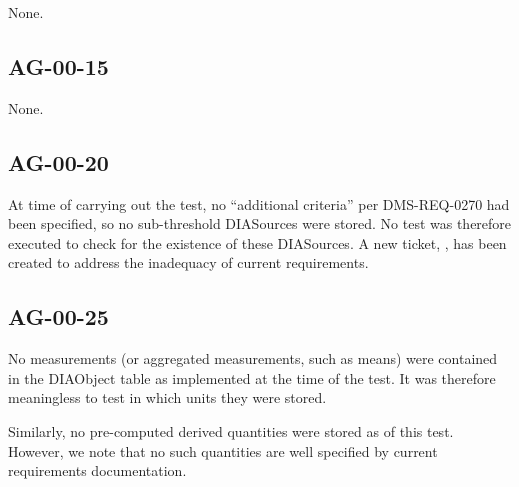 \documentclass[DM,lsstdraft,STR,toc]{lsstdoc}
\begin{document}
None.

\subsection{AG-00-15}
\label{sect:deviation-ag-00-15}

None.

\subsection{AG-00-20}
\label{sect:deviation-ag-00-20}

At time of carrying out the test, no ``additional criteria'' per DMS-REQ-0270 had been specified, so no sub-threshold DIASources were stored.
No test was therefore executed to check for the existence of these DIASources.
A new ticket, , has been created to address the inadequacy of current requirements.

\subsection{AG-00-25}
\label{sect:deviation-ag-00-25}

No measurements (or aggregated measurements, such as means) were contained in
the DIAObject table as implemented at the time of the test. It was
therefore meaningless to test in which units they were stored.

Similarly, no pre-computed derived quantities were stored as of this test.
However, we note that no such quantities are well specified by current requirements documentation.
\end{document}
